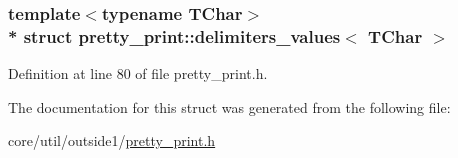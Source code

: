 \subsubsection*{template$<$typename T\+Char$>$\\*
struct pretty\+\_\+print\+::delimiters\+\_\+values$<$ T\+Char $>$}



Definition at line 80 of file pretty\+\_\+print.\+h.



The documentation for this struct was generated from the following file\+:\begin{DoxyCompactItemize}
\item 
core/util/outside1/\hyperlink{pretty__print_8h}{pretty\+\_\+print.\+h}\end{DoxyCompactItemize}
